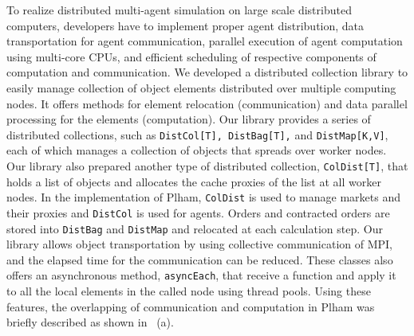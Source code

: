 To realize distributed multi-agent simulation on large scale distributed computers,
developers have to implement proper agent distribution, data transportation for agent communication, parallel execution of agent computation using multi-core CPUs, and efficient scheduling of respective components of computation and communication.
We developed a distributed collection library to easily manage
collection of object elements distributed over multiple computing nodes.
It offers methods for element relocation (communication) and data parallel processing for the elements (computation).
Our library provides a series of distributed collections, such as \texttt{DistCol[T], DistBag[T],} and
\texttt{DistMap[K,V]}, each of which manages a collection of objects that spreads over worker nodes.
Our library also prepared another type of distributed collection, \texttt{ColDist[T]}, that holds a list of objects
and allocates the cache proxies of the list at all worker nodes.
In the implementation of Plham, \texttt{ColDist} is used to manage markets and their proxies and
\texttt{DistCol} is used for agents.
Orders and contracted orders are stored into \texttt{DistBag} and \texttt{DistMap} and relocated at each calculation step.
Our library allows object transportation by using collective communication of MPI,
and the elapsed time for the communication can be reduced.
These classes also offers an asynchronous method,
\texttt{asyncEach},
that receive a function and apply it to all the local elements in the called node using thread pools.
Using these features, the overlapping of communication and computation in Plham was briefly described as shown in ~(a).

